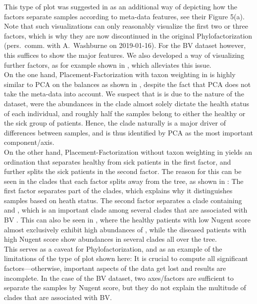 This type of plot was suggested in \cite{Washburne2017a} as an additional way of depicting
how the factors separate samples according to meta-data features, see their Figure 5(a).
Note that such visualizations can only reasonably visualize the first two or three factors,
which is why they are now discontinued in the original Phylofactorization
(pers.~comm. with A.~Washburne on 2019-01-16).
For the \ac{BV} dataset however, this suffices to show the major features.
We also developed a way of visualizing further factors,
as for example shown in ,
which alleviates this issue.
\\
On the one hand, Placement-Factorization with taxon weighting
in 
is highly similar to PCA on the balances
as shown in ,
despite the fact that PCA does not take the meta-data into account.
We suspect that is is due to the nature of the dataset,
were the abundances in the  clade almost solely dictate the health status of each individual,
and roughly half the samples belong to either the healthy or the sick group of patients.
Hence, the  clade naturally is a major driver of differences between samples,
and is thus identified by PCA as the most important component/axis.
\\
On the other hand, Placement-Factorization without taxon weighting
in  yields an ordination
that separates healthy from sick patients in the first factor,
and further splits the sick patients in the second factor.
The reason for this can be seen in the clades that each factor splits away from the tree,
as shown in :
The first factor separates part of the  clades,
which explains why it distinguishes samples based on heath status.
The second factor separates a clade containing  and ,
which is an important clade among several clades that are associated with \ac{BV} \cite{Srinivasan2012}.
This can also be seen in ,
where the healthy patients with low Nugent score
almost exclusively exhibit high abundances of ,
while the diseased patients with high Nugent score show abundances in several clades all over the tree.
\\
This serves as a caveat for Phylofactorization,
and as an example of the limitations of the type of plot shown here:
It is crucial to compute all significant factors---otherwise,
important aspects of the data get lost and results are incomplete.
In the case of the \ac{BV} dataset, %
two axes/factors are sufficient to separate the samples by Nugent score,
but they do not explain the multitude of clades that are associated with \ac{BV}.

